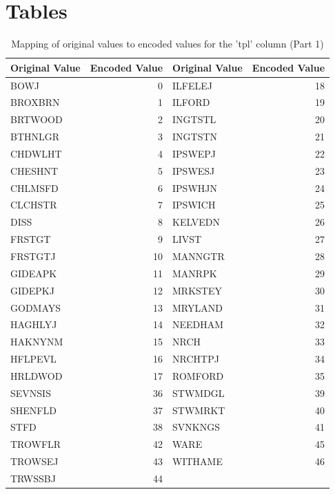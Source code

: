 \appendix
\section{Tables}

\begin{table}[!htbp]
    \centering
    \begin{tabular}{|l|r||l|r|}
    \hline
    \textbf{Original Value} & \textbf{Encoded Value} & \textbf{Original Value} & \textbf{Encoded Value} \\
    \hline
    BOWJ & 0 & ILFELEJ & 18 \\
    BROXBRN & 1 & ILFORD & 19 \\
    BRTWOOD & 2 & INGTSTL & 20 \\
    BTHNLGR & 3 & INGTSTN & 21 \\
    CHDWLHT & 4 & IPSWEPJ & 22 \\
    CHESHNT & 5 & IPSWESJ & 23 \\
    CHLMSFD & 6 & IPSWHJN & 24 \\
    CLCHSTR & 7 & IPSWICH & 25 \\
    DISS & 8 & KELVEDN & 26 \\
    FRSTGT & 9 & LIVST & 27 \\
    FRSTGTJ & 10 & MANNGTR & 28 \\
    GIDEAPK & 11 & MANRPK & 29 \\
    GIDEPKJ & 12 & MRKSTEY & 30 \\
    GODMAYS & 13 & MRYLAND & 31 \\
    HAGHLYJ & 14 & NEEDHAM & 32 \\
    HAKNYNM & 15 & NRCH & 33 \\
    HFLPEVL & 16 & NRCHTPJ & 34 \\
    HRLDWOD & 17 & ROMFORD & 35 \\
    SEVNSIS & 36 & STWMDGL & 39 \\
    SHENFLD & 37 & STWMRKT & 40 \\
    STFD & 38 & SVNKNGS & 41 \\
    TROWFLR & 42 & WARE & 45 \\
    TROWSEJ & 43 & WITHAME & 46 \\
    TRWSSBJ & 44 &  &  \\
    \hline
    \end{tabular}
    \caption{Mapping of original values to encoded values for the 'tpl' column (Part 1)}
    \label{tab:tpl encoding}
\end{table}

